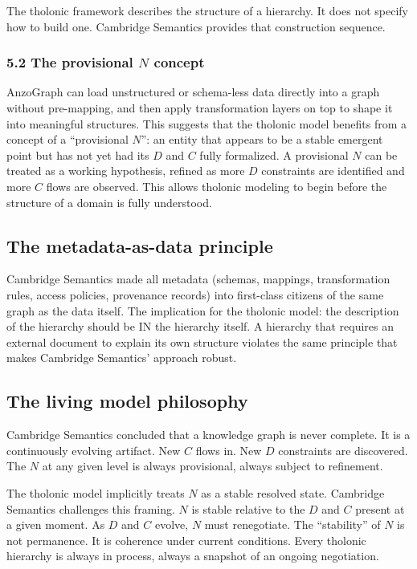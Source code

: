 \documentclass[12pt]{article}
\begin{document}
The tholonic framework describes the structure of a hierarchy. It does
not specify how to build one. Cambridge Semantics provides that
construction sequence.

\subsubsection{\texorpdfstring{5.2 The provisional \(N\)
concept}{5.2 The provisional N concept}}\label{the-provisional-n-concept}

AnzoGraph can load unstructured or schema-less data directly into a
graph without pre-mapping, and then apply transformation layers on top
to shape it into meaningful structures. This suggests that the tholonic
model benefits from a concept of a ``provisional \(N\)'': an entity that
appears to be a stable emergent point but has not yet had its \(D\) and
\(C\) fully formalized. A provisional \(N\) can be treated as a working
hypothesis, refined as more \(D\) constraints are identified and more
\(C\) flows are observed. This allows tholonic modeling to begin before
the structure of a domain is fully understood.

\subsection{The metadata-as-data principle}\label{the-metadata-as-data-principle}

Cambridge Semantics made all metadata (schemas, mappings, transformation
rules, access policies, provenance records) into first-class citizens of
the same graph as the data itself. The implication for the tholonic
model: the description of the hierarchy should be IN the hierarchy
itself. A hierarchy that requires an external document to explain its
own structure violates the same principle that makes Cambridge
Semantics' approach robust.

\subsection{The living model philosophy}\label{the-living-model-philosophy}

Cambridge Semantics concluded that a knowledge graph is never complete.
It is a continuously evolving artifact. New \(C\) flows in. New \(D\)
constraints are discovered. The \(N\) at any given level is always
provisional, always subject to refinement.

The tholonic model implicitly treats \(N\) as a stable resolved state.
Cambridge Semantics challenges this framing. \(N\) is stable relative to
the \(D\) and \(C\) present at a given moment. As \(D\) and \(C\)
evolve, \(N\) must renegotiate. The ``stability'' of \(N\) is not
permanence. It is coherence under current conditions. Every tholonic
hierarchy is always in process, always a snapshot of an ongoing
negotiation.
\end{document}
